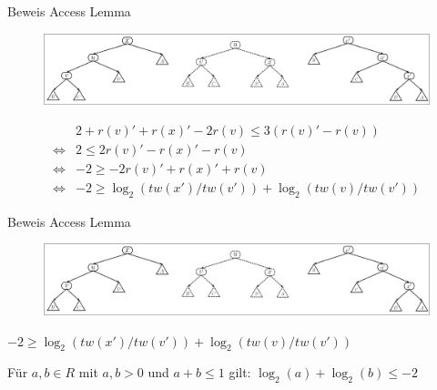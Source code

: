 \documentclass[11pt]{beamer}
\begin{document}
\begin{frame}{Beweis Access Lemma}
	\begin{figure}[H]
		\centering
		\includegraphics[width=1\textwidth]{"Medien/pres/zigZigKlein"}
		
	\end{figure}
    \begin{align*}
         &	2 + r\left(v\right)' + r\left(x\right)' - 2 r\left(v\right) \leq  3\left(r\left(v\right)'- r\left(v\right)\right)\\       
        \Leftrightarrow &2 \leq 2r\left(v\right)' -  r\left(x\right)' - r\left(v\right)\\
         \Leftrightarrow & -2 \geq -2r\left(v\right)' +  r\left(x\right)' + r\left(v\right)\\
        \Leftrightarrow & -2 \geq \log_2\left(\mathit{tw}\left(x'\right) / \mathit{tw}\left(v'\right)\right) +   \log_2\left(\mathit{tw}\left(v\right) / \mathit{tw}\left(v'\right)\right)
    \end{align*}
	
\end{frame}
\begin{frame}{Beweis Access Lemma}
	\begin{figure}[H]
		\centering
		\includegraphics[width=1\textwidth]{"Medien/pres/zigZigKlein"}
		
	\end{figure}

	$-2 \geq \log_2\left(\mathit{tw}\left(x'\right) / \mathit{tw}\left(v'\right)\right) +   \log_2\left(\mathit{tw}\left(v\right) / \mathit{tw}\left(v'\right)\right)$\\
	 \bigskip

	 Für $a,b \in \mathit{R}$ mit $a,b > 0$ und $a + b \leq 1$ gilt: $\log_2\left(a\right) + \log_2\left(b\right) \leq -2$
\end{frame}
\end{document}
